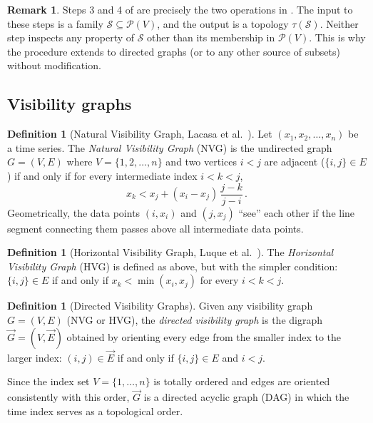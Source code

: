 \documentclass[11pt,a4paper]{article}
\theoremstyle{plain}
\theoremstyle{definition}
\newtheorem{definition}[theorem]{Definition}
\newtheorem{remark}[theorem]{Remark}
\newcommand{\powerset}{\mathcal{P}}
\newcommand{\subbase}{\mathcal{S}}
\begin{document}
\begin{remark}\label{rem:nada-procedure-universal}
Steps 3 and 4 of  are precisely the two operations in
.  The input to these steps is a family
$\subbase \subseteq \powerset(V)$, and the output is a topology
$\tau(\subbase)$.  Neither step inspects any property of $\subbase$ other than
its membership in $\powerset(V)$.  This is why the procedure extends to
directed graphs (or to any other source of subsets) without modification.
\end{remark}

\subsection{Visibility graphs}\label{subsec:visibility}

\begin{definition}[Natural Visibility Graph, Lacasa et al.~\cite{Lacasa2008}]%
\label{def:nvg}
Let $(x_1, x_2, \ldots, x_n)$ be a time series.  The \emph{Natural Visibility
Graph} (NVG) is the undirected graph $G = (V, E)$ where $V = \{1, 2, \ldots, n\}$
and two vertices $i < j$ are adjacent ($\{i, j\} \in E$) if and only if for
every intermediate index $i < k < j$,
\[
  x_k < x_j + (x_i - x_j)\,\frac{j - k}{j - i}\,.
\]
Geometrically, the data points $(i, x_i)$ and $(j, x_j)$ ``see'' each other if
the line segment connecting them passes above all intermediate data points.
\end{definition}

\begin{definition}[Horizontal Visibility Graph, Luque et al.~\cite{Luque2009}]%
\label{def:hvg}
The \emph{Horizontal Visibility Graph} (HVG) is defined as above, but with the
simpler condition: $\{i, j\} \in E$ if and only if $x_k < \min(x_i, x_j)$ for
every $i < k < j$.
\end{definition}

\begin{definition}[Directed Visibility Graphs]\label{def:directed-vg}
Given any visibility graph $G = (V, E)$ (NVG or HVG), the \emph{directed
visibility graph} is the digraph $\vec{G} = (V, \vec{E})$ obtained by orienting
every edge from the smaller index to the larger index: $(i, j) \in \vec{E}$ if
and only if $\{i, j\} \in E$ and $i < j$.

Since the index set $V = \{1, \ldots, n\}$ is totally ordered and edges are
oriented consistently with this order, $\vec{G}$ is a directed acyclic graph
(DAG) in which the time index serves as a topological order.
\end{definition}
\end{document}
